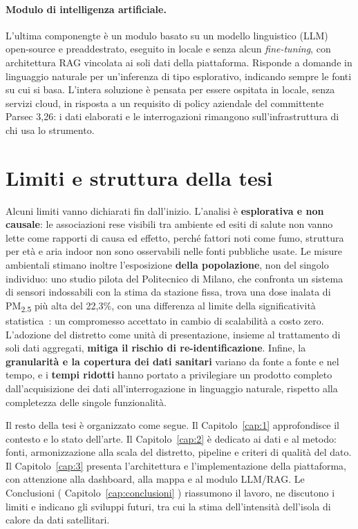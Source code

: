 \paragraph{Modulo di intelligenza artificiale.}
L'ultima componengte è un modulo basato su un modello linguistico (LLM) open-source e preaddestrato, eseguito in locale e senza alcun \emph{fine-tuning}, con architettura RAG vincolata ai soli dati della piattaforma. Risponde a domande in linguaggio naturale per un'inferenza di tipo esplorativo, indicando sempre le fonti su cui si basa. L'intera soluzione è pensata per essere ospitata in locale, senza servizi cloud, in risposta a un requisito di policy aziendale del committente Parsec 3,26: i dati elaborati e le interrogazioni rimangono sull'infrastruttura di chi usa lo strumento.

\section{Limiti e struttura della tesi}
\label{sec:intro-limiti}

Alcuni limiti vanno dichiarati fin dall'inizio. L'analisi è \textbf{esplorativa e non causale}: le associazioni rese visibili tra ambiente ed esiti di salute non vanno lette come rapporti di causa ed effetto, perché fattori noti come fumo, struttura per età e aria indoor non sono osservabili nelle fonti pubbliche usate. Le misure ambientali stimano inoltre l'esposizione \textbf{della popolazione}, non del singolo individuo: uno studio pilota del Politecnico di Milano, che confronta un sistema di sensori indossabili con la stima da stazione fissa, trova una dose inalata di PM\textsubscript{2.5} più alta del 22,3\%, con una differenza al limite della significatività statistica~\cite{bernasconi2025}: un compromesso accettato in cambio di scalabilità a costo zero. L'adozione del distretto come unità di presentazione, insieme al trattamento di soli dati aggregati, \textbf{mitiga il rischio di re-identificazione}. Infine, la \textbf{granularità e la copertura dei dati sanitari} variano da fonte a fonte e nel tempo, e i \textbf{tempi ridotti} hanno portato a privilegiare un prodotto completo dall'acquisizione dei dati all'interrogazione in linguaggio naturale, rispetto alla completezza delle singole funzionalità.

Il resto della tesi è organizzato come segue. Il Capitolo~\ref{cap:1} approfondisce il contesto e lo stato dell'arte. Il Capitolo~\ref{cap:2} è dedicato ai dati e al metodo: fonti, armonizzazione alla scala del distretto, pipeline e criteri di qualità del dato. Il Capitolo~\ref{cap:3} presenta l'architettura e l'implementazione della piattaforma, con attenzione alla dashboard, alla mappa e al modulo LLM/RAG. Le Conclusioni ( Capitolo~\ref{cap:conclusioni} ) riassumono il lavoro, ne discutono i limiti e indicano gli sviluppi futuri, tra cui la stima dell'intensità dell'isola di calore da dati satellitari.
